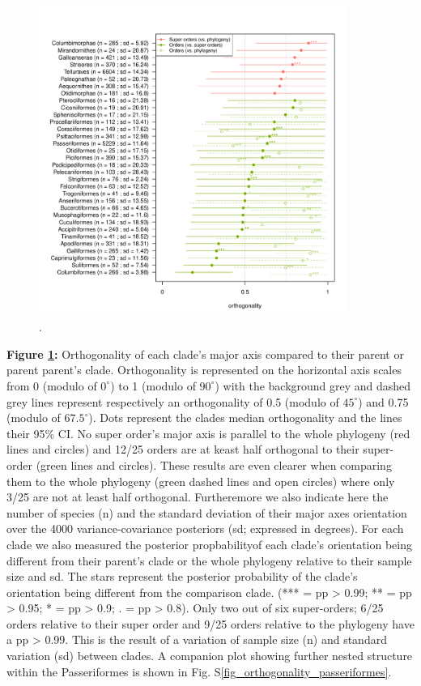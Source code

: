 \documentclass[12pt,letterpaper]{article}
\begin{document}
\begin{figure}[!htbp]
\centering
   \includegraphics[width=0.9\textwidth]{Figures/orthogonality_results.pdf}
\caption{.}
\label{Fig:orthogonality}
\end{figure}

\noindent \textbf{Figure \ref{Fig:orthogonality}:}
Orthogonality of each clade's major axis compared to their parent or parent parent's clade.
Orthogonality is represented on the horizontal axis scales from 0 (modulo of $0^\circ$) to 1 (modulo of $90^\circ$) with the background grey and dashed grey lines represent respectively an orthogonality of 0.5 (modulo of $45^\circ$) and 0.75 (modulo of $67.5^\circ$).
Dots represent the clades median orthogonality and the lines their 95\% CI.
No super order's major axis is parallel to the whole phylogeny (red lines and circles) and 12/25 orders are at keast half orthogonal to their super-order (green lines and circles).
These results are even clearer when comparing them to the whole phylogeny (green dashed lines and open circles) where only 3/25 are not at least half orthogonal.
Furtheremore we also indicate here the number of species (n) and the standard deviation of their major axes orientation over the 4000 variance-covariance posteriors (sd; expressed in degrees).
For each clade we also measured the posterior propbabilityof each clade's orientation being different from their parent's clade or the whole phylogeny relative to their sample size and sd.
The stars represent the posterior probability of the clade's orientation being different from the comparison clade. (*** = pp > 0.99; ** = pp > 0.95; * = pp > 0.9; . = pp > 0.8).
Only two out of six super-orders; 6/25 orders relative to their super order and 9/25 orders relative to the phylogeny have a pp > 0.99.
This is the result of a variation of sample size (n) and standard variation (sd) between clades. 
A companion plot showing further nested structure within the Passeriformes is shown in Fig. S\ref{fig_orthogonality_passeriformes}.
\end{document}

